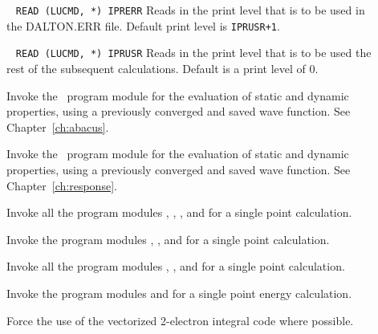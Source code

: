 \begin{description}
\item[]\verb| |\newline
\verb|READ (LUCMD, *) IPRERR|
Reads in the print level that is to be used in the DALTON.ERR
file. Default print level is \verb|IPRUSR+1|.

\item[]\verb| |\newline
\verb|READ (LUCMD, *) IPRUSR|
Reads in the print level that is to be used the rest of the subsequent
calculations. Default is a print level of 0.

\item[] Invoke the \aba\ program module for the evaluation of static
and dynamic properties, using a previously converged and saved wave function. See Chapter~\ref{ch:abacus}.

\item[]

Invoke the \resp\ program module for the evaluation of static and dynamic
properties, using a previously converged and saved wave function. See Chapter~\ref{ch:response}.

\item[]

Invoke all the program modules {\her}, {\sir}, {\resp}, and {\aba} for a single point
     calculation.

\item[]

Invoke the program modules {\her}, {\sir}, and {\aba} for a single point
calculation.

\item[]

Invoke all the program modules {\her}, {\sir}, and {\resp} for a single point
calculation.

\item[]

Invoke the program modules {\her} and {\sir} for a single point energy calculation.


\item[] Force the use of the vectorized 2-electron integral code {\eri} where possible.



\end{description}
